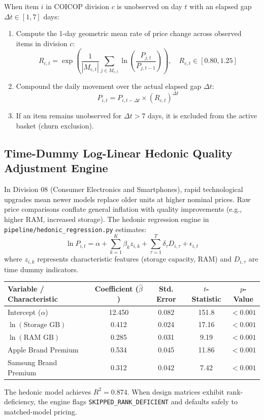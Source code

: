 \documentclass[11pt,a4paper]{article}
\begin{document}
When item $i$ in COICOP division $c$ is unobserved on day $t$ with an elapsed gap $\Delta t \in [1, 7]$ days:
\begin{enumerate}
    \item Compute the 1-day geometric mean rate of price change across observed items in division $c$:
    \begin{equation}
    R_{c, t} = \exp \left( \frac{1}{|M_{c, t}|} \sum_{j \in M_{c, t}} \ln \left( \frac{P_{j, t}}{P_{j, t-1}} \right) \right), \quad R_{c, t} \in [0.80, 1.25]
    \end{equation}
    \item Compound the daily movement over the actual elapsed gap $\Delta t$:
    \begin{equation}
    \widehat{P}_{i, t} = P_{i, t - \Delta t} \times \left( R_{c, t} \right)^{\Delta t}
    \end{equation}
    \item If an item remains unobserved for $\Delta t > 7$ days, it is excluded from the active basket (churn exclusion).
\end{enumerate}

\subsection{Time-Dummy Log-Linear Hedonic Quality Adjustment Engine}
In Division 08 (Consumer Electronics and Smartphones), rapid technological upgrades mean newer models replace older units at higher nominal prices. Raw price comparisons conflate general inflation with quality improvements (e.g., higher RAM, increased storage). The hedonic regression engine in \texttt{pipeline/hedonic\_regression.py} estimates:
\begin{equation}
\ln P_{i, t} = \alpha + \sum_{k=1}^K \beta_k z_{i, k} + \sum_{\tau=1}^T \delta_\tau D_{i, \tau} + \epsilon_{i, t}
\end{equation}
where $z_{i,k}$ represents characteristic features (storage capacity, RAM) and $D_{i,\tau}$ are time dummy indicators. 

\begin{center}
\small
\begin{tabular}{lcccc}
\toprule
\textbf{Variable / Characteristic} & \textbf{Coefficient ($\hat{\beta}$)} & \textbf{Std. Error} & \textbf{$t$-Statistic} & \textbf{$p$-Value} \\
\midrule
Intercept ($\alpha$) & 12.450 & 0.082 & 151.8 & $< 0.001$ \\
$\ln(\text{Storage GB})$ & 0.412 & 0.024 & 17.16 & $< 0.001$ \\
$\ln(\text{RAM GB})$ & 0.285 & 0.031 & 9.19 & $< 0.001$ \\
Apple Brand Premium & 0.534 & 0.045 & 11.86 & $< 0.001$ \\
Samsung Brand Premium & 0.312 & 0.042 & 7.42 & $< 0.001$ \\
\bottomrule
\end{tabular}
\end{center}
The hedonic model achieves $R^2 = 0.874$. When design matrices exhibit rank-deficiency, the engine flags \texttt{SKIPPED\_RANK\_DEFICIENT} and defaults safely to matched-model pricing.
\end{document}
